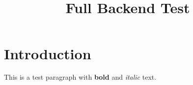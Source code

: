 \documentclass{article}
\title{Full Backend Test}
\begin{document}
\maketitle
\section{Introduction}
This is a test paragraph with \textbf{bold} and \textit{italic} text.
\end{document}
